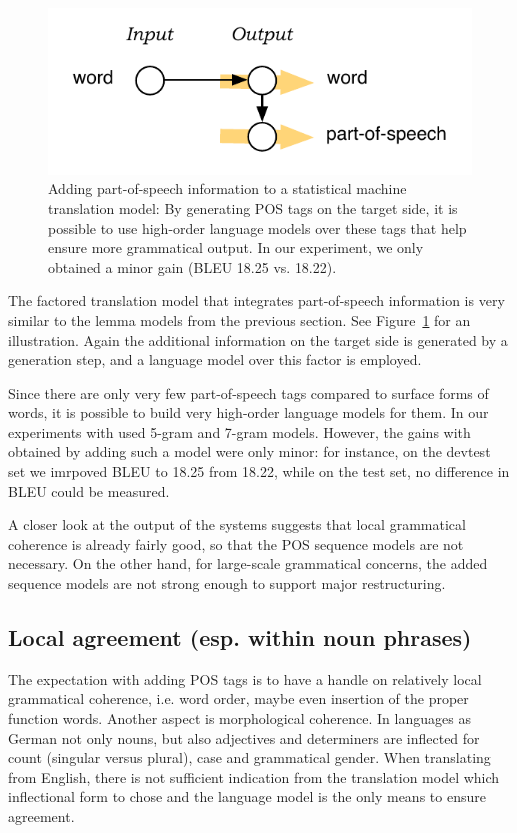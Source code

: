 \documentclass[11pt]{report}
\theoremstyle{plain}
\begin{document}
{\begin{figure}
\begin{center}
\includegraphics[scale=1]{factored-simple-pos-lm.pdf}
\end{center}
\caption{Adding part-of-speech information to a statistical machine translation model: By generating POS tags on the target side, it is possible to use high-order language models over these tags that help ensure more grammatical output. In our experiment, we only obtained a minor gain (BLEU 18.25 vs. 18.22).}
\label{fig:german:pos-model}
\end{figure}

The factored translation model that integrates part-of-speech information is very similar to the lemma models from the previous section. See Figure~\ref{fig:german:pos-model} for an illustration. Again the additional information on the target side is generated by a generation step, and a language model over this factor is employed.

Since there are only very few part-of-speech tags compared to surface forms of words, it is possible to build very high-order language models for them. In our experiments with used 5-gram and 7-gram models. However, the gains with obtained by adding such a model were only minor: for instance, on the devtest set we imrpoved BLEU to 18.25 from 18.22, while on the test set, no difference in BLEU could be measured.

A closer look at the output of the systems suggests that local grammatical coherence is already fairly good, so that the POS sequence models are not necessary. On the other hand, for large-scale grammatical concerns, the added sequence models are not strong enough to support major restructuring.

\subsection{Local agreement (esp. within noun phrases)}
The expectation with adding POS tags is to have a handle on relatively local grammatical coherence, i.e. word order, maybe even insertion of the proper function words. Another aspect is morphological coherence. In languages as German not only nouns, but also adjectives and determiners are inflected for count (singular versus plural), case and grammatical gender. When translating from English, there is not sufficient indication from the translation model which inflectional form to chose and the language model is the only means to ensure agreement.

}
\end{document}

